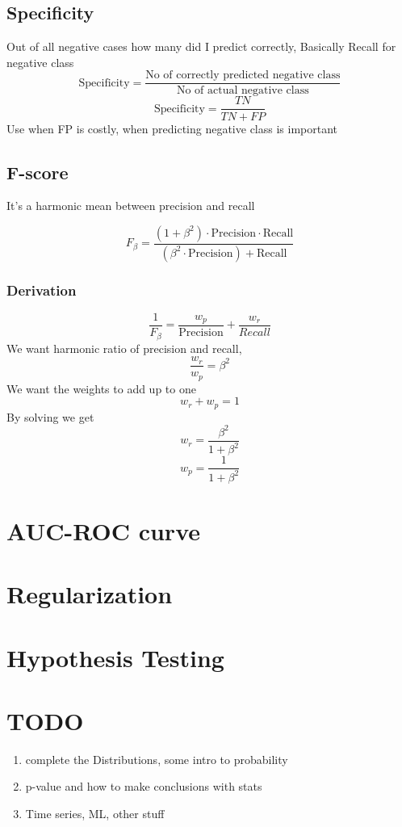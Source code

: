 \documentclass[12pt]{extarticle}
\begin{document}
\subsection{Specificity}
Out of all negative cases how many did I predict correctly, Basically Recall for negative class
$$ \text{Specificity} = \frac{\text{No of correctly predicted negative class}}{\text{No of actual negative class}}  $$
$$ \text{Specificity} = \frac{TN}{TN+FP}$$
Use when FP is costly, when predicting negative class is important

\subsection{F-score}
It's a harmonic mean between precision and recall

$$F_\beta = \frac{(1 + \beta^2) \cdot \text{Precision} \cdot \text{Recall}}{(\beta^2 \cdot \text{Precision}) + \text{Recall}}$$
\subsubsection{Derivation} 
$$ \frac{1}{F_\beta} = \frac{w_p}{\text{Precision}} + \frac{w_r}{Recall} $$
We want harmonic ratio of precision and recall, 
$$ \frac{w_r}{w_p} = \beta^2$$
We want the weights to add up to one
$$ w_r + w_p = 1 $$
By solving we get
$$ w_r = \frac{\beta^2}{1 + \beta^2} $$ 
$$ w_p = \frac{1}{1 + \beta^2} $$

\section{AUC-ROC curve}
\section{Regularization}
\subsection{}

\section{Hypothesis Testing}


\section{TODO}
\begin{enumerate}
    \item complete the Distributions, some intro to probability
    \item p-value and how to make conclusions with stats
    \item Time series, ML, other stuff

\end{enumerate}
\end{document}
